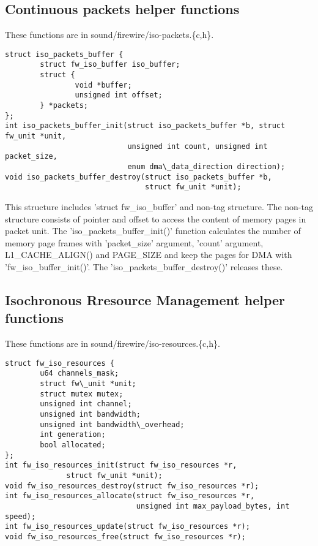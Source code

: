 \documentclass[onecolumn]{article}
\begin{document}
\subsection{Continuous packets helper functions}

These functions are in sound/firewire/iso-packets.\{c,h\}.

\begin{verbatim}
struct iso_packets_buffer {
        struct fw_iso_buffer iso_buffer;
        struct {
                void *buffer;
                unsigned int offset;
        } *packets;
};
int iso_packets_buffer_init(struct iso_packets_buffer *b, struct fw_unit *unit,
                            unsigned int count, unsigned int packet_size,
                            enum dma\_data_direction direction);
void iso_packets_buffer_destroy(struct iso_packets_buffer *b,
                                struct fw_unit *unit);
\end{verbatim}

This structure includes 'struct fw\_iso\_buffer' and non-tag structure. The non-tag structure consists of pointer and offset to access the content of memory pages in packet unit. The 'iso\_packets\_buffer\_init()' function calculates the number of memory page frames with 'packet\_size' argument, 'count' argument, L1\_CACHE\_ALIGN() and PAGE\_SIZE and keep the pages for DMA with 'fw\_iso\_buffer\_init()'. The 'iso\_packets\_buffer\_destroy()' releases these.

\subsection{Isochronous Rresource Management helper functions}

These functions are in sound/firewire/iso-resources.\{c,h\}.

\begin{verbatim}
struct fw_iso_resources {
        u64 channels_mask;
        struct fw\_unit *unit;
        struct mutex mutex;
        unsigned int channel;
        unsigned int bandwidth;
        unsigned int bandwidth\_overhead;
        int generation;
        bool allocated;
};
int fw_iso_resources_init(struct fw_iso_resources *r,
			  struct fw_unit *unit);
void fw_iso_resources_destroy(struct fw_iso_resources *r);
int fw_iso_resources_allocate(struct fw_iso_resources *r,
                              unsigned int max_payload_bytes, int speed);
int fw_iso_resources_update(struct fw_iso_resources *r);
void fw_iso_resources_free(struct fw_iso_resources *r);
\end{verbatim}
\end{document}
